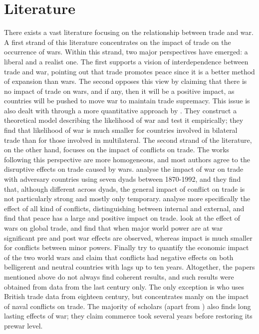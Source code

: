 \documentclass[12pt,a4paper,notitlepage,english]{article}
\begin{document}
\section{Literature} \label{literature}
There exists a vast literature focusing on the relationship between trade and war.
A first strand of this literature concentrates on the impact of trade on the occurrence of wars. Within this strand, two major perspectives have emerged: a liberal and a realist one. The first supports a vision of interdependence between trade and war, pointing out that trade promotes peace since it is a better method of expansion than wars. The second opposes this view by claiming that there is no impact of trade on wars, and if any, then it will be a positive impact, as countries will be pushed to move war to maintain trade supremacy. This issue is also dealt with through a more quantitative approach by \cite{martin2008make}. They construct a theoretical model describing the likelihood of war and test it empirically; they find that likelihood of war is much smaller for countries involved in bilateral trade than for those involved in multilateral. 
The second strand of the literature, on the other hand, focuses on the impact of conflicts on trade. The works following this perspective are more homogeneous, and most authors agree to the disruptive effects on trade caused by wars. \cite{levy2004trading} analyse the impact of war on trade with adversary countries using seven dyads between 1870-1992, and they find that, although different across dyads, the general impact of conflict on trade is not particularly strong and mostly only temporary. \cite{blomberg2006much} analyse more specifically the effect of all kind of conflicts, distinguishing between internal and external, and find that peace has a large and positive impact on trade. \cite{anderton2001impact} look at the effect of wars on global trade, and find that when major world power are at war significant pre and post war effects are observed, whereas impact is much smaller for conflicts between minor powers. Finally \cite{glick2010collateral} try to quantify the economic impact of the two world wars and claim that conflicts had negative effects on both belligerent and neutral countries with lags up to ten years. Altogether, the papers mentioned above do not always find coherent results, and such results were obtained from data from the last century only. The only exception is \cite{rahman2010fighting} who uses British trade data from eighteen century, but concentrates manly on the impact of naval conflicts on trade. The majority of scholars (apart from \cite{levy2004trading}) also finds long lasting effects of war; they claim commerce took several years before restoring its prewar level.\\
\end{document}
